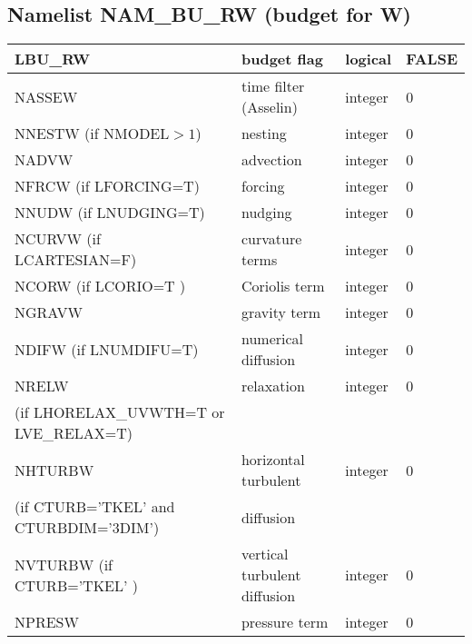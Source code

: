 \subsection{Namelist NAM\_BU\_RW (budget for W)}


\begin{center}
\begin{tabular} {|p{8cm}|p{4cm}|>{\centering}p{1.5cm}|p{1.5cm}<{\centering}|}
\hline
LBU\_RW  & budget flag & logical & FALSE\index{LBU\_RW!\innam{NAM\_BU\_RW}} \\\hline
NASSEW   & time filter (Asselin)   & integer  &  0 \index{NASSEW!\innam{NAM\_BU\_RW}} \\\hline
NNESTW (if NMODEL$>1$) & nesting           & integer  &  0 \index{NNESTW!\innam{NAM\_BU\_RW}} \\\hline
NADVW   & advection & integer  &  0 \index{NADVW!\innam{NAM\_BU\_RW}}\\\hline
NFRCW (if LFORCING=T)   & forcing           & integer  &  0 \index{NFRCW!\innam{NAM\_BU\_RW}} \\\hline
NNUDW (if LNUDGING=T)   & nudging           & integer  &  0 \index{NNUDW!\innam{NAM\_BU\_RW}} \\\hline
NCURVW (if LCARTESIAN=F)  & curvature terms   & integer  &  0 \index{NCURVW!\innam{NAM\_BU\_RW}}\\\hline
NCORW (if LCORIO=T )   & Coriolis  term    & integer  &  0 \index{NCORW!\innam{NAM\_BU\_RW}}\\\hline
NGRAVW   & gravity  term     & integer  &  0 \index{NGRAVW!\innam{NAM\_BU\_RW}}\\\hline
NDIFW (if LNUMDIFU=T)   & numerical diffusion & integer  &  0 \index{NDIFW!\innam{NAM\_BU\_RW}}\\\hline
NRELW    & relaxation        & integer  &  0 \index{NRELW!\innam{NAM\_BU\_RW}}\\
(if LHORELAX\_UVWTH=T or LVE\_RELAX=T) &  &   &   \\\hline
NHTURBW  & horizontal turbulent & integer  &  0 \index{NHTURBW!\innam{NAM\_BU\_RW}}\\
(if CTURB='TKEL' and CTURBDIM='3DIM') &diffusion &   &  \\\hline
NVTURBW (if CTURB='TKEL' )  & vertical turbulent diffusion & integer  &  0 \index{NVTURBW!\innam{NAM\_BU\_RW}}\\\hline
NPRESW   & pressure term       & integer  &  0 \index{NPRESW!\innam{NAM\_BU\_RW}}  \\
\hline
\end{tabular}
\end{center}
\newpage
